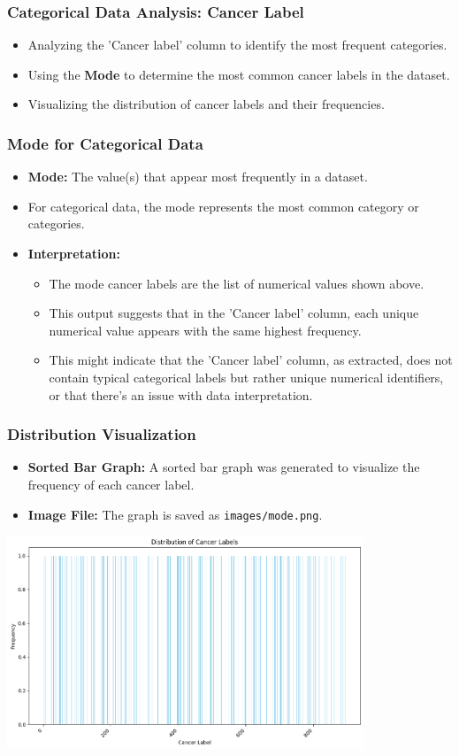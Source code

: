 \begin{frame}
    \frametitle{Categorical Data Analysis: Cancer Label}
    \begin{itemize}
        \item Analyzing the 'Cancer label' column to identify the most frequent categories.
        \item Using the \textbf{Mode} to determine the most common cancer labels in the dataset.
        \item Visualizing the distribution of cancer labels and their frequencies.
    \end{itemize}
\end{frame}

\begin{frame}[fragile]
    \frametitle{Mode for Categorical Data}
    \begin{itemize}
        \item \textbf{Mode:} The value(s) that appear most frequently in a dataset.
        \item For categorical data, the mode represents the most common category or categories.

        \item \textbf{Interpretation:}
              \begin{itemize}
                  \item The mode cancer labels are the list of numerical values shown above.
                  \item  This output suggests that in the 'Cancer label' column, each unique numerical value appears with the same highest frequency.
                  \item This might indicate that the 'Cancer label' column, as extracted, does not contain typical categorical labels but rather unique numerical identifiers, or that there's an issue with data interpretation.
              \end{itemize}
    \end{itemize}
\end{frame}

\begin{frame}
    \frametitle{Distribution Visualization}
    \begin{itemize}
        \item \textbf{Sorted Bar Graph:} A sorted bar graph was generated to visualize the frequency of each cancer label.
        \item \textbf{Image File:} The graph is saved as \texttt{images/mode.png}.
    \end{itemize}
    \includegraphics[width=0.8\textwidth]{images/mode.png}
\end{frame}